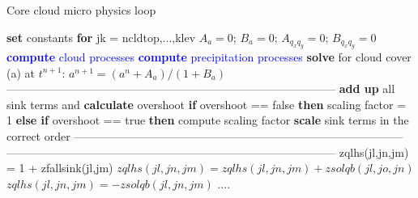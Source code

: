 \documentclass[
a4paper,     %
12pt,        %
article,
onecolumn,   %
openany,     %
]{memoir}
\begin{document}
\newpage
%
\begin{algorithm}[H]
\caption{Core cloud micro physics loop}\label{alg:core-loop}
\begin{algorithmic}
\State \textbf{set} constants
\vspace{.1cm}
\State \textbf{for} jk = ncldtop,...,klev
\Indent
{}
\Indent
\State $A_{a} = 0$;\;\;\; $B_{a} = 0$; \;\;\; 
$A_{q_{x} q_{y}} = 0$; \;\;\; $B_{q_{x} q_{y}} = 0$
\EndIndent
\vspace{.2cm}
\State \textcolor{blue}{\textbf{compute} cloud processes} \label{lis:cloud-proc}
\State \textcolor{blue}{\textbf{compute} precipitation processes} \label{lis:precipitation-proc}
\vspace{.3cm}
\State \textbf{solve} for cloud cover (a) at $t^{n+1}$: $a^{n+1} = (a^{n} + A_{a})/(1 + B_{a})$
\vspace{.1cm}
\Indent
\vspace{-.2cm}
\State ---------------------------------------------------------------------------------------
\vspace{-.2cm}
\State \textbf{add up} all sink terms and \textbf{calculate} overshoot
\State \textbf{if} overshoot == false \textbf{then} scaling factor = 1
\State \textbf{else if} overshoot == true \textbf{then} compute scaling factor 
\State \textbf{scale} sink terms in the correct order
\EndFor
\EndFor
\EndFor
\vspace{-.2cm}
\State ---------------------------------------------------------------------------------------
\vspace{-.2cm}
\EndIndent
\vspace{.5cm}
\Indent
\vspace{-.2cm}
\State ---------------------------------------------------------------------------------------
\vspace{-.2cm}
\State zqlhs(jl,jn,jm) = 1 + zfallsink(jl,jm)
\State $zqlhs(jl,jn,jm)=zqlhs(jl,jn,jm) + zsolqb(jl,jo,jn)$ 
\EndFor
\EndIf
{}
\State $zqlhs(jl,jn,jm)= -zsolqb(jl,jn,jm)$ 
\EndIf
\EndFor
\EndFor
\EndFor
\State ....
\EndIndent
\EndIndent
{}
\end{algorithmic}
\end{algorithm}
%
%
\end{document}
